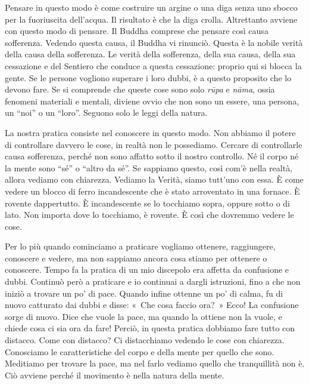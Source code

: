Pensare in questo modo è come costruire un argine o una diga senza uno
sbocco per la fuoriuscita dell'acqua. Il risultato è che la diga crolla.
Altrettanto avviene con questo modo di pensare. Il Buddha comprese che
pensare così causa sofferenza. Vedendo questa causa, il Buddha vi
rinunciò. Questa è la nobile verità della causa della sofferenza. Le
verità della sofferenza, della sua causa, della sua cessazione e del
Sentiero che conduce a questa cessazione: proprio qui si blocca la
gente. Se le persone vogliono superare i loro dubbi, è a questo
proposito che lo devono fare. Se si comprende che queste cose sono solo
\emph{rūpa} e \emph{nāma}, ossia fenomeni materiali e mentali, diviene
ovvio che non sono un essere, una persona, un ``noi'' o un ``loro''.
Seguono solo le leggi della natura.

La nostra pratica consiste nel conoscere in questo modo. Non abbiamo il
potere di controllare davvero le cose, in realtà non le possediamo.
Cercare di controllarle causa sofferenza, perché non sono affatto sotto
il nostro controllo. Né il corpo né la mente sono ``sé'' o ``altro da
sé''. Se sappiamo questo, così com'è nella realtà, allora vediamo con
chiarezza. Vediamo la Verità, siamo tutt'uno con essa. È come vedere un
blocco di ferro incandescente che è stato arroventato in una fornace. È
rovente dappertutto. È incandescente se lo tocchiamo sopra, oppure sotto
o di lato. Non importa dove lo tocchiamo, è rovente. È così che dovremmo
vedere le cose.

Per lo più quando cominciamo a praticare vogliamo ottenere, raggiungere,
conoscere e vedere, ma non sappiamo ancora cosa stiamo per ottenere o
conoscere. Tempo fa la pratica di un mio discepolo era affetta da
confusione e dubbi. Continuò però a praticare e io continuai a dargli
istruzioni, fino a che non iniziò a trovare un po' di pace. Quando
infine ottenne un po' di calma, fu di nuovo catturato dai dubbi e disse:
«~Che cosa faccio ora?~» Ecco! La confusione sorge di nuovo. Dice che
vuole la pace, ma quando la ottiene non la vuole, e chiede cosa ci sia
ora da fare! Perciò, in questa pratica dobbiamo fare tutto con distacco.
Come con distacco? Ci distacchiamo vedendo le cose con chiarezza.
Conosciamo le caratteristiche del corpo e della mente per quello che
sono. Meditiamo per trovare la pace, ma nel farlo vediamo quello che
tranquillità non è. Ciò avviene perché il movimento è nella natura della
mente.

